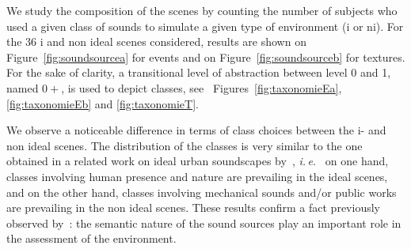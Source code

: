 \documentclass[12pt]{elsarticle}
\newcommand{\ie}{\emph{i.\,e.}}
\newcommand{\cf}{cf.}
\begin{document}

We study the composition of the scenes by counting the number of subjects who used a given class of sounds to simulate a given type of environment (i or ni). For the 36 i and non ideal scenes considered, results are shown on Figure~\ref{fig:soundsourcea} for events and on Figure~\ref{fig:soundsourceb} for textures. For the sake of clarity, a transitional level of abstraction between level 0 and 1, named $0+$, is used to depict classes, see ~Figures~\ref{fig:taxonomieEa}, \ref{fig:taxonomieEb} and \ref{fig:taxonomieT}.


We observe a noticeable difference in terms of class choices between the i- and non ideal scenes. The distribution of the classes is very similar to the one obtained in a related work on ideal urban soundscapes by~\cite{guastavino2006ideal}, \ie~ on one hand, classes involving human presence and nature are prevailing in the ideal scenes, and on the other hand, classes involving mechanical sounds and/or public works are prevailing in the non ideal scenes. These results confirm a fact previously observed by~\cite{raimbault2005urban,dubois2006cognitive}: the semantic nature of the sound sources play an important role in the assessment of the environment.

\end{document}
